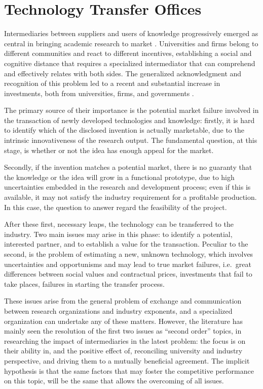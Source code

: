 \section{Technology Transfer Offices}

Intermediaries between suppliers and users of knowledge progressively emerged as central in bringing academic research to market \citep{Landry2013}. Universities and firms belong to different communities and react to different incentives, establishing a social and cognitive distance that requires a specialized intermediator that can comprehend and effectively relates with both sides. The generalized acknowledgment and recognition of this problem led to a recent and substantial increase in investments, both from universities, firms, and governments \citep{Muscio2010}.

The primary source of their importance is the potential market failure involved in the transaction of newly developed technologies and knowledge: firstly, it is hard to identify which of the disclosed invention is actually marketable, due to the intrinsic innovativeness of the research output. The fundamental question, at this stage, is whether or not the idea has enough appeal for the market.

Secondly, if the invention matches a potential market, there is no guaranty that the knowledge or the idea will grow in a functional prototype, due to high uncertainties embedded in the research and development process; even if this is available, it may not satisfy the industry requirement for a profitable production. In this case, the question to answer regard the feasibility of the project.

After these first, necessary leaps, the technology can be transferred to the industry. Two main issues may arise in this phase: to identify a potential, interested partner, and to establish a value for the transaction. Peculiar to the second, is the problem of estimating a new, unknown technology, which involves uncertainties and opportunisms and may lead to true market failures, i.e.\ great differences between social values and contractual prices, investments that fail to take places, failures in starting the transfer process.

These issues arise from the general problem of exchange and communication between research organizations and industry exponents, and a specialized organization can undertake any of these matters. However, the literature has mainly seen the resolution of the first two issues as \enquote{second order} topics, in researching the impact of intermediaries in the latest problem: the focus is on their ability in, and the positive effect of, reconciling university and industry perspective, and driving them to a mutually beneficial agreement. The implicit hypothesis is that the same factors that may foster the competitive performance on this topic, will be the same that allows the overcoming of all issues.

